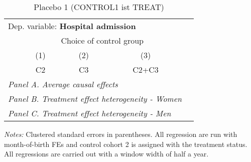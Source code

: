  \begin{table}[H] \centering \begin{threeparttable} \caption{Placebo 1 (CONTROL1 ist TREAT) } {\def\sym#1{\ifmmode^{#1}\else\(^{#1}\)\fi} \begin{tabular}{l*{4}{c}} \toprule \multicolumn{4}{l}{Dep. variable: \textbf{Hospital admission}} \\ & \multicolumn{3}{c}{Choice of control group} \\ \cmidrule(lr){2-4}
            &\multicolumn{1}{c}{(1)}&\multicolumn{1}{c}{(2)}&\multicolumn{1}{c}{(3)}\\
            &\multicolumn{1}{c}{C2}&\multicolumn{1}{c}{C3}&\multicolumn{1}{c}{C2+C3}\\
\midrule
 \multicolumn{4}{l}{\emph{Panel A. Average causal effects}} \\      \midrule\multicolumn{4}{l}{\emph{Panel B. Treatment effect heterogeneity - Women}} \\      \midrule\multicolumn{4}{l}{\emph{Panel C. Treatment effect heterogeneity - Men}} \\      
\bottomrule \end{tabular} } \begin{tablenotes} \item \scriptsize \emph{Notes:} Clustered standard errors in parentheses. All regression are run with month-of-birth FEs and control cohort 2 is assigned with the treatment status. All regressions are carried out with a window width of half a year. \end{tablenotes} \end{threeparttable} \end{table} 
